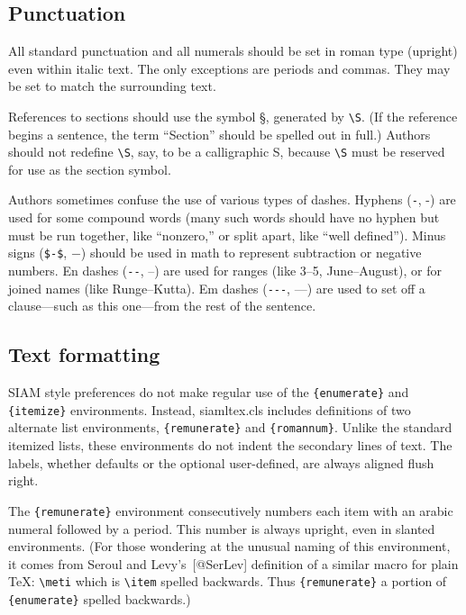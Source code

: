\documentclass[]{article}
\begin{document}
\subsection{Punctuation}\label{punctuation}

All standard punctuation and all numerals should be set in roman type
(upright) even within italic text. The only exceptions are periods and
commas. They may be set to match the surrounding text.

References to sections should use the symbol §, generated by
\texttt{\textbackslash{}S}. (If the reference begins a sentence, the
term ``Section'' should be spelled out in full.) Authors should not
redefine \texttt{\textbackslash{}S}, say, to be a calligraphic S,
because \texttt{\textbackslash{}S} must be reserved for use as the
section symbol.

Authors sometimes confuse the use of various types of dashes. Hyphens
(\texttt{-}, -) are used for some compound words (many such words should
have no hyphen but must be run together, like ``nonzero,'' or split
apart, like ``well defined''). Minus signs (\texttt{\$-\$}, \(-\))
should be used in math to represent subtraction or negative numbers. En
dashes (\texttt{-\/-}, --) are used for ranges (like 3--5,
June--August), or for joined names (like Runge--Kutta). Em dashes
(\texttt{-\/-\/-}, ---) are used to set off a clause---such as this
one---from the rest of the sentence.

\subsection{Text formatting}\label{text-formatting}

SIAM style preferences do not make regular use of the
\texttt{\{enumerate\}} and \texttt{\{itemize\}} environments. Instead,
{siamltex.cls} includes definitions of two alternate list environments,
\texttt{\{remunerate\}} and \texttt{\{romannum\}}. Unlike the standard
itemized lists, these environments do not indent the secondary lines of
text. The labels, whether defaults or the optional user-defined, are
always aligned flush right.

The \texttt{\{remunerate\}} environment consecutively numbers each item
with an arabic numeral followed by a period. This number is always
upright, even in slanted environments. (For those wondering at the
unusual naming of this environment, it comes from Seroul and
Levy's~{[}@SerLev{]} definition of a similar macro for plain TeX:
\texttt{\textbackslash{}meti} which is \texttt{\textbackslash{}item}
spelled backwards. Thus \texttt{\{remunerate\}} a portion of
\texttt{\{enumerate\}} spelled backwards.)
\end{document}
